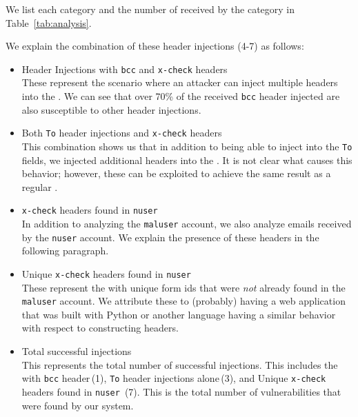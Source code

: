 We list each category and the number of \emails received by the category in Table~\ref{tab:analysis}. 



We explain the combination of these header injections (4-7) as follows:
\begin{itemize}
	\item \Email Header Injections with \texttt{bcc} and \texttt{x-check} headers\\
	  These represent the scenario where an attacker can inject multiple headers into the \emails. We can see that over 70\% of the received \texttt{bcc} header injected \emails are also susceptible to other header injections.
	
	\item Both \texttt{To} header injections and \texttt{x-check} headers \\
	This combination shows us that in addition to being able to inject into the \texttt{To} fields, we injected additional headers into the \email. It is not clear what causes this behavior; however, these can be exploited to achieve the same result as a regular \ehi.
	
	\item \texttt{x-check} headers found in \texttt{nuser} \emails\\
	  In addition to analyzing the \texttt{maluser} account, we also analyze emails received by the \texttt{nuser} account.
      We explain the presence of these headers in the following paragraph.

	\item Unique \texttt{x-check} headers found in \texttt{nuser} \emails\\
	  These represent the \emails with unique form ids that were \emph{not} already found in the \texttt{maluser} account. We attribute these \emails to (probably) having a web application that was built with Python or another language having a similar behavior with respect to constructing headers.
	
	\item Total successful injections\\
	  This represents the total number of successful injections. This includes the \ehi with \texttt{bcc} header\,(1), \texttt{To} header injections alone\,(3), and Unique \texttt{x-check} headers found in \texttt{nuser} \emails\,(7). This is the total number of vulnerabilities that were found by our system.

	
\end{itemize}
